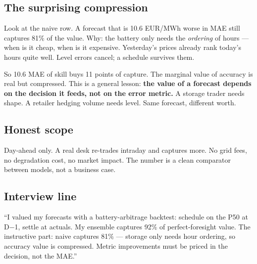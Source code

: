 \subsection{The surprising compression}

Look at the naive row. A forecast that is 10.6 EUR/MWh worse in MAE
still captures 81\% of the value. Why: the battery only needs the
\emph{ordering} of hours --- when is it cheap, when is it expensive.
Yesterday's prices already rank today's hours quite well.
Level errors cancel; a schedule survives them.

So 10.6 MAE of skill buys 11 points of capture. The marginal value
of accuracy is real but compressed. This is a general lesson:
\textbf{the value of a forecast depends on the decision it feeds,
not on the error metric.} A storage trader needs shape. A retailer
hedging volume needs level. Same forecast, different worth.

\subsection{Honest scope}

Day-ahead only. A real desk re-trades intraday and captures more.
No grid fees, no degradation cost, no market impact. The number is
a clean comparator between models, not a business case.

\subsection{Interview line}

``I valued my forecasts with a battery-arbitrage backtest: schedule
on the P50 at D$-$1, settle at actuals. My ensemble captures 92\% of
perfect-foresight value. The instructive part: naive captures 81\% ---
storage only needs hour ordering, so accuracy value is compressed.
Metric improvements must be priced in the decision, not the MAE.''
